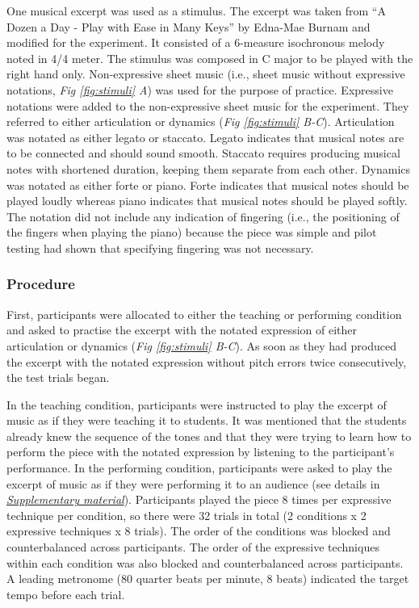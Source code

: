 \documentclass[
  man,floatsintext]{apa6}
\begin{document}
One musical excerpt was used as a stimulus. The excerpt was taken from ``A Dozen a Day - Play with Ease in Many Keys'' by Edna-Mae Burnam and modified for the experiment. It consisted of a 6-measure isochronous melody noted in 4/4 meter. The stimulus was composed in C major to be played with the right hand only. Non-expressive sheet music (i.e., sheet music without expressive notations, \emph{Fig \ref{fig:stimuli} A}) was used for the purpose of practice. Expressive notations were added to the non-expressive sheet music for the experiment. They referred to either articulation or dynamics (\emph{Fig \ref{fig:stimuli} B-C}). Articulation was notated as either legato or staccato. Legato indicates that musical notes are to be connected and should sound smooth. Staccato requires producing musical notes with shortened duration, keeping them separate from each other. Dynamics was notated as either forte or piano. Forte indicates that musical notes should be played loudly whereas piano indicates that musical notes should be played softly. The notation did not include any indication of fingering (i.e., the positioning of the fingers when playing the piano) because the piece was simple and pilot testing had shown that specifying fingering was not necessary.

\hypertarget{procedure}{%
\subsubsection{Procedure}\label{procedure}}

First, participants were allocated to either the teaching or performing condition and asked to practise the excerpt with the notated expression of either articulation or dynamics (\emph{Fig \ref{fig:stimuli} B-C}). As soon as they had produced the excerpt with the notated expression without pitch errors twice consecutively, the test trials began.

In the teaching condition, participants were instructed to play the excerpt of music as if they were teaching it to students. It was mentioned that the students already knew the sequence of the tones and that they were trying to learn how to perform the piece with the notated expression by listening to the participant's performance. In the performing condition, participants were asked to play the excerpt of music as if they were performing it to an audience (see details in \emph{\protect\hyperlink{supplementary}{Supplementary material}}). Participants played the piece 8 times per expressive technique per condition, so there were 32 trials in total (2 conditions x 2 expressive techniques x 8 trials). The order of the conditions was blocked and counterbalanced across participants. The order of the expressive techniques within each condition was also blocked and counterbalanced across participants. A leading metronome (80 quarter beats per minute, 8 beats) indicated the target tempo before each trial.
\end{document}
